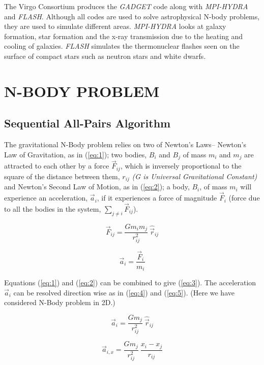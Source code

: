 The Virgo Consortium produces the \textit{GADGET} code along with \textit{MPI-HYDRA} and \textit{FLASH}. Although all codes are used to solve astrophysical N-body problems, they are used to simulate different areas. \textit{MPI-HYDRA} looks at galaxy formation, star formation and the x-ray transmission due to the heating and cooling of galaxies. \textit{FLASH} simulates the thermonuclear flashes seen on the surface of compact stars such as neutron stars and white dwarfs.

\section{N-BODY PROBLEM}

\subsection{Sequential All-Pairs Algorithm}

The gravitational N-Body problem relies on two of Newton's Laws{--} Newton's Law of Gravitation, as in (\ref{eq:1}); two bodies, $B_i$ and $B_j$ of mass $m_i$ and $m_j$ are attracted to each other by a force $\vec{F}_{ij}$, which is inversely proportional to the square of the distance between them, $r_{ij}$ \textit{(G is Universal Gravitational Constant)} and Newton's Second Law of Motion, as in (\ref{eq:2}); a body, $B_i$, of mass $m_i$ will experience an acceleration, $\vec{a}_i$, if it experiences a force of magnitude $\vec{F}_i$ (force due to all the bodies in the system, \(\sum_{j \neq i}\vec{F}_{ij}\)).

\begin{equation} \label{eq:1}
\vec{F}_{ij} = \frac{Gm_im_j}{r_{ij}^2} \: \hat{\vec{r}}_{ij}
\end{equation}

\begin{equation} \label{eq:2}
\vec{a}_i = \frac{\vec{F}_i}{m_i}
\end{equation}

Equations (\ref{eq:1}) and (\ref{eq:2}) can be combined to give (\ref{eq:3}). The acceleration $\vec{a}_i$ can be resolved direction wise as in (\ref{eq:4}) and (\ref{eq:5}). (Here we have considered N-Body problem in 2D.)  

\begin{equation} \label{eq:3}
\vec{a}_i = \frac{Gm_j}{r_{ij}^2} \: 
\hat{\vec{r}}_{ij}
\end{equation}

\begin{equation} \label{eq:4}
\vec{a}_{i, x} = \frac{Gm_j}{r_{ij}^2} \: 
\frac{x_i - x_j}{r_{ij}}
\end{equation}


